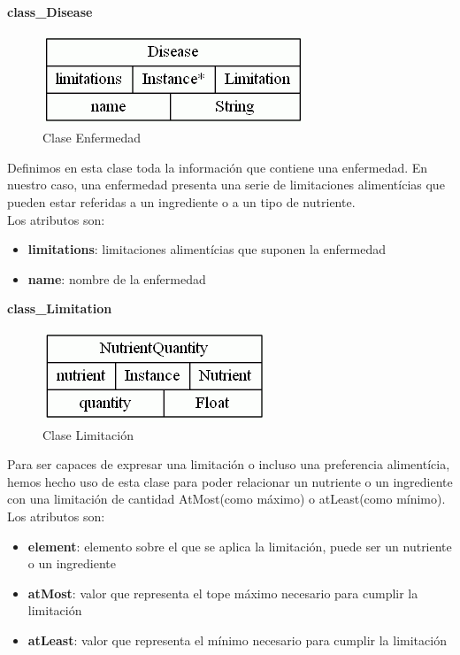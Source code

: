 \documentclass[12]{article}
\begin{document}
\vspace{0.5cm}

\textbf{class\_Disease}
\begin{figure}[H]
\centering
\includegraphics[scale=0.5]{images/classDisease.png}
\caption{Clase Enfermedad}
\label{enfermedad}
\end{figure}

Definimos en esta clase toda la información que contiene una enfermedad. En nuestro caso, una enfermedad presenta una serie de limitaciones alimentícias que pueden estar referidas a un ingrediente o a un tipo de nutriente. 
\\

Los atributos son: 
\begin{itemize}
\item \textbf{limitations}: limitaciones alimentícias que suponen la enfermedad
\item \textbf{name}: nombre de la enfermedad
\end{itemize}


\vspace{0.5cm}

\textbf{class\_Limitation}
\begin{figure}[H]
\centering
\includegraphics[scale=0.5]{images/classNutrientQuantity.png}
\caption{Clase Limitación}
\label{limitacion}
\end{figure}

Para ser capaces de expresar una limitación o incluso una preferencia alimentícia, hemos hecho uso de esta clase para poder relacionar un nutriente o un ingrediente con una limitación de cantidad AtMost(como máximo) o atLeast(como mínimo).
\\

Los atributos son:
\begin{itemize}
\item \textbf{element}: elemento sobre el que se aplica la limitación, puede ser un nutriente o un ingrediente
\item \textbf{atMost}: valor que representa el tope máximo necesario para cumplir la limitación
\item \textbf{atLeast}: valor que representa el mínimo necesario para cumplir la limitación
\end{itemize}
\end{document}
